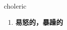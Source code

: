 
\begin{frame}
{\huge choleric}
\begin{center}
\begin{enumerate}\Large
  \item \textbf{易怒的，暴躁的}
\end{enumerate}
\end{center}
\end{frame}
